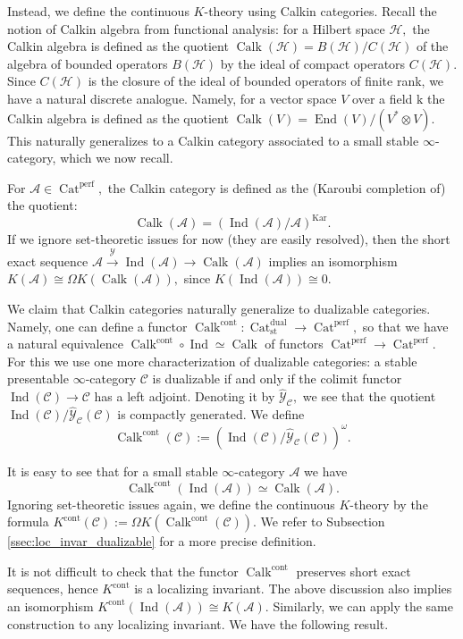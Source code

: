 \documentclass[11pt,leqno]{amsart}
\numberwithin{equation}{section}
\def\End{\operatorname{End}}
\newcommand{\xto}{\xrightarrow}
\newcommand{\Cat}{\operatorname{Cat}}
\newcommand{\cont}{\operatorname{cont}}
\newcommand{\st}{\operatorname{st}}
\newcommand{\dual}{\operatorname{dual}}
\newcommand{\mk}{\mathrm k}
\newcommand{\cA}{{\mathcal A}}
\newcommand{\cC}{{\mathcal C}}
\newcommand{\cY}{{\mathcal Y}}
\newcommand{\cH}{{\mathcal H}}
\newcommand{\perf}{\operatorname{perf}}
\newcommand{\Kar}{\operatorname{Kar}}
\newcommand{\Ind}{\operatorname{Ind}}
\newcommand{\Calk}{\operatorname{Calk}}
\begin{document}
Instead, we define the continuous $K$-theory using Calkin categories. Recall the notion of Calkin algebra from functional analysis: for a Hilbert space $\cH,$ the Calkin algebra is defined as the quotient $\Calk(\cH)=B(\cH)/C(\cH)$ of the algebra of bounded operators $B(\cH)$ by the ideal of compact operators $C(\cH).$ Since $C(\cH)$ is the closure of the ideal of bounded operators of finite rank, we have a natural discrete analogue. Namely, for a vector space $V$ over a field $\mk$ the Calkin algebra is defined as the quotient $\Calk(V)=\End(V)/(V^*\otimes V).$ This naturally generalizes to a Calkin category associated to a small stable $\infty$-category, which we now recall.

For $\cA\in\Cat^{\perf},$ the Calkin category is defined as the (Karoubi completion of) the quotient:
$$\Calk(\cA)=(\Ind(\cA)/\cA)^{\Kar}.$$ 
If we ignore set-theoretic issues for now (they are easily resolved), then the short exact sequence $\cA\xto{\cY}\Ind(\cA)\to\Calk(\cA)$ implies an isomorphism $K(\cA)\cong\Omega K(\Calk(\cA)),$ since $K(\Ind(\cA))\cong 0.$ 

We claim that Calkin categories naturally generalize to dualizable categories. Namely, one can define a functor $\Calk^{\cont}:\Cat_{\st}^{\dual}\to\Cat^{\perf},$ so that we have a natural equivalence $\Calk^{\cont}\circ\Ind\simeq\Calk$ of functors $\Cat^{\perf}\to \Cat^{\perf}.$  
For this we use one more characterization of dualizable categories: a stable presentable $\infty$-category $\cC$ is dualizable if and only if the colimit functor $\Ind(\cC)\to \cC$ has a left adjoint. Denoting it by $\hat{\cY}_{\cC},$ we see that the quotient $\Ind(\cC)/\hat{\cY}_{\cC}(\cC)$ is compactly generated. We define
$$\Calk^{\cont}(\cC):=(\Ind(\cC)/\hat{\cY}_{\cC}(\cC))^{\omega}.$$

It is easy to see that for a small stable $\infty$-category $\cA$ we have
$$\Calk^{\cont}(\Ind(\cA))\simeq\Calk(\cA).$$
Ignoring set-theoretic issues again, we define the continuous $K$-theory by the formula $K^{\cont}(\cC):=\Omega K(\Calk^{\cont}(\cC)).$ We refer to Subsection \ref{ssec:loc_invar_dualizable} for a more precise definition.

It is not difficult to check that the functor $\Calk^{\cont}$ preserves short exact sequences, hence $K^{\cont}$ is a localizing invariant. The above discussion also implies an isomorphism $K^{\cont}(\Ind(\cA))\cong K(\cA).$ Similarly, we can apply the same construction to any localizing invariant. We have the following result.
\end{document}
